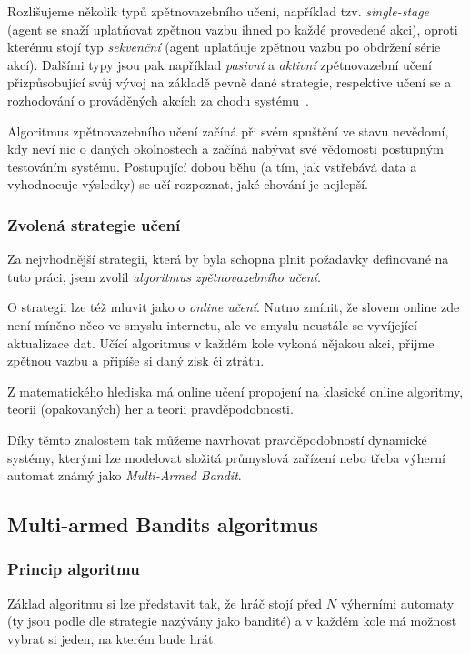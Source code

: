 \documentclass[thesis=M,czech]{FITthesis}[2014/05/07]
\begin{document}
Rozlišujeme několik typů zpětnovazebního učení, například tzv. \emph{single-stage} (agent se snaží uplatňovat zpětnou vazbu ihned po každé provedené akci), oproti kterému stojí typ \emph{sekvenční} (agent uplatňuje zpětnou vazbu po obdržení série akcí). Dalšími typy jsou pak například \emph{pasivní} a \emph{aktivní} zpětnovazební učení přizpůsobující svůj vývoj na základě pevně dané strategie, respektive učení se a rozhodování o prováděných akcích za chodu systému~\cite{reinforcement}.

Algoritmus zpětnovazebního učení začíná při svém spuštění ve stavu nevědomí, kdy neví nic o daných okolnostech a začíná nabývat své vědomosti postupným testováním systému. Postupující dobou běhu (a tím, jak vstřebává data a vyhodnocuje výsledky) se učí rozpoznat, jaké chování je nejlepší.

\subsubsection{Zvolená strategie učení}
\label{sub:online}
Za nejvhodnější strategii, která by byla schopna plnit požadavky definované na tuto práci, jsem zvolil \emph{algoritmus zpětnovazebního učení}.

O strategii lze též mluvit jako o \emph{online učení}. Nutno zmínit, že slovem online zde není míněno něco ve smyslu internetu, ale ve smyslu neustále se vyvíjející aktualizace dat. Učící algoritmus v každém kole vykoná nějakou akci, přijme zpětnou vazbu a připíše si daný zisk či ztrátu.

Z matematického hlediska má online učení propojení na klasické online algoritmy, teorii (opakovaných) her a teorii pravděpodobnosti.

Díky těmto znalostem tak můžeme navrhovat pravděpodobností dynamické systémy, kterými lze modelovat složitá průmyslová zařízení nebo třeba výherní automat známý jako \emph{Multi-Armed Bandit}.

\subsection{Multi-armed Bandits algoritmus}
\label{sec:multi}

\subsubsection{Princip algoritmu}
Základ algoritmu si lze představit tak, že hráč stojí před $N$ výherními automaty (ty jsou podle dle strategie nazývány jako bandité) a v každém kole má možnost vybrat si jeden, na kterém bude hrát.
\end{document}
